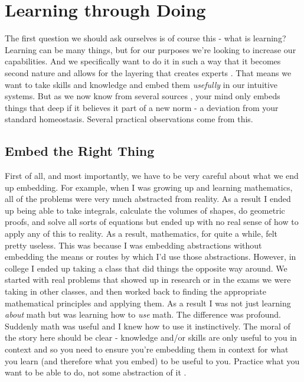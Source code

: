 \documentclass[11pt,a5paper]{book}
\begin{document}
\section{Learning through Doing}
The first question we should ask ourselves is of course this - what is learning? Learning can be many things, but for our purposes we're looking to increase our capabilities. And we specifically want to do it in such a way that it becomes second nature and allows for the layering that creates experts \cite{ericsson}. That means we want to take skills and knowledge and embed them \textit{usefully} in our intuitive systems. But as we now know from several sources \cite{duhigg} \cite{ericsson}, your mind only embeds things that deep if it believes it part of a new norm - a deviation from your standard homeostasis. Several practical observations come from this.
\newline

\subsection{Embed the Right Thing}

First of all, and most importantly, we have to be very careful about what we end up embedding. For example, when I was growing up and learning mathematics, all of the problems were very much abstracted from reality. As a result I ended up being able to take integrals, calculate the volumes of shapes, do geometric proofs, and solve all sorts of equations but ended up with no real sense of how to apply any of this to reality. As a result, mathematics, for quite a while, felt pretty useless. This was because I was embedding abstractions without embedding the means or routes by which I'd use those abstractions. However, in college I ended up taking a class that did things the opposite way around. We started with real problems that showed up in research or in the exams we were taking in other classes, and then worked back to finding the appropriate mathematical principles and applying them. As a result I was not just learning \textit{about} math but was learning how to \textit{use} math. The difference was profound. Suddenly math was useful and I knew how to use it instinctively. The moral of the story here should be clear - knowledge and/or skills are only useful to you in context and so you need to ensure you're embedding them in context for what you learn (and therefore what you embed) to be useful to you. Practice what you want to be able to do, not some abstraction of it \cite{stick}.
\newline
\end{document}
